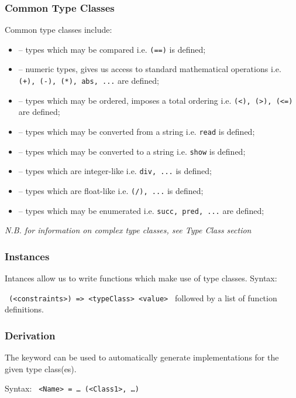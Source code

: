 \subsubsection{Common Type Classes}
Common type classes include:
\begin{itemize}
  \item \texttt{} -- types which may be compared i.e. \texttt{(==)} is defined;
  \item \texttt{} -- numeric types, gives us access to standard mathematical operations i.e. \texttt{(+), (-), (*), abs, ...} are defined;
  \item \texttt{} -- types which may be ordered, imposes a total ordering i.e. \texttt{(<), (>), (<=)} are defined;
  \item \texttt{} -- types which may be converted from a string i.e. \texttt{read} is defined;
  \item \texttt{} -- types which may be converted to a string i.e. \texttt{show} is defined;
  \item \texttt{} -- types which are integer-like i.e. \texttt{div, ...} is defined;
  \item \texttt{} -- types which are float-like i.e. \texttt{(/), ...} is defined;
  \item \texttt{} -- types which may be enumerated i.e. \texttt{succ, pred, ...} are defined;
\end{itemize}

\textit{N.B. for information on complex type classes, see Type Class section}

\subsubsection{Instances}
Intances allow us to write functions which make use of type classes. Syntax:

\texttt{ (<constraints>) => <typeClass> <value> } followed by a list of function definitions.

\subsubsection{Derivation}
The \texttt{} keyword can be used to automatically generate implementations for the given type class(es).

Syntax: \texttt{ <Name> = \ldots {} (<Class1>, \ldots)}

